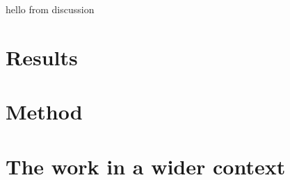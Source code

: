 \documentclass[thesis.tex]{subfiles}
\begin{document}
hello from discussion

\section{Results}

\section{Method}

\section{The work in a wider context}
\end{document}
